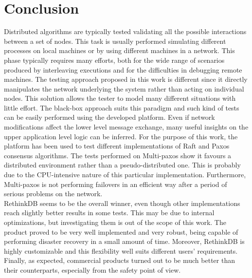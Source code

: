 \chapter{Conclusion}\label{chp:conclusion}

Distributed algorithms are typically tested validating all the possible interactions between a set of nodes. This task is usually performed simulating different processes on local machines or by using different machines in a network. This phase typically requires many efforts, both for the wide range of scenarios produced by interleaving executions and for the difficulties in debugging remote machines. The testing approach proposed in this work is different since it directly manipulates the network underlying the system rather than acting on individual nodes. This solution allows the tester to model many different situations with little effort. The black-box approach suits this paradigm and such kind of tests can be easily performed using the developed platform. Even if network modifications affect the lower level message exchange, many useful insights on the upper application level logic can be inferred.
For the purpose of this work, the platform has been used to test different implementations of Raft and Paxos consensus algorithms. The tests performed on Multi-paxos show it favours a distributed environment rather than a pseudo-distributed one. This is probably due to the CPU-intensive nature of this particular implementation. Furthermore, Multi-paxos is not performing failovers in an efficient way after a period of serious problems on the network.\\
RethinkDB seems to be the overall winner, even though other implementations reach slightly better results in some tests. This may be due to internal optimizations, but investigating them is out of the scope of this work. The product proved to be very well implemented and very robust, being capable of performing disaster recovery in a small amount of time. Moreover, RethinkDB is highly customizable and this flexibility well suits different users’ requirements.\\
Finally, as expected, commercial products turned out to be much better than their counterparts, especially from the safety point of view.